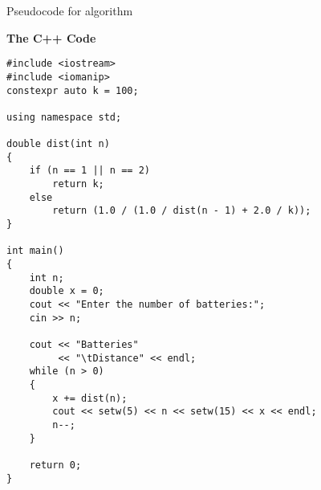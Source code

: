\documentclass[a4paper, 12pt]{article}
\makeatletter
\def\BState{\State\hskip-\ALG@thistlm}
\makeatother
\begin{document}
\begin{algorithm*}
\caption{Pseudocode for algorithm}\label{euclid}
\end{algorithm*}

\pagebreak
\textbf{The C++ Code}
\begin{lstlisting}
#include <iostream>
#include <iomanip>
constexpr auto k = 100;

using namespace std;

double dist(int n)
{
    if (n == 1 || n == 2)
        return k;
    else
        return (1.0 / (1.0 / dist(n - 1) + 2.0 / k));
}

int main()
{
    int n;
    double x = 0;
    cout << "Enter the number of batteries:";
    cin >> n;

    cout << "Batteries"
         << "\tDistance" << endl;
    while (n > 0)
    {
        x += dist(n);
        cout << setw(5) << n << setw(15) << x << endl;
        n--;
    }

    return 0;
}
\end{lstlisting}
\end{document}
